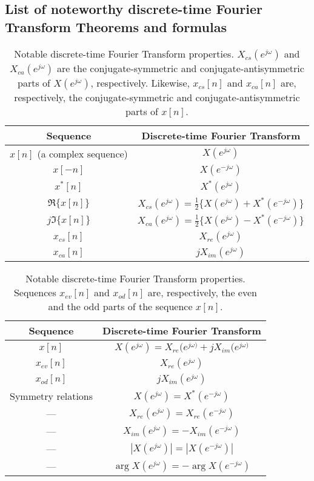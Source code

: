 \documentclass[\documentfontsize, twocolumn]{\classname}
\begin{document}
\subsection{List of noteworthy discrete-time Fourier Transform Theorems and formulas}

\begin{table*}[ht]
\centering
\begin{tabular}{c c}
    \hline
    \textbf{Sequence} & \textbf{Discrete-time Fourier Transform} \\
    \hline
    $x[n]$ (a complex sequence) & $X(e^{j\omega})$ \\
    \hline
    $x[-n]$ & $X(e^{-j\omega})$ \\
    $x^*[n]$ & $X^*(e^{j\omega})$ \\
    $\Re{\{x[n]\}}$ & $X_{cs}(e^{j\omega}) = \frac 1 2 \{X(e^{j\omega}) + X^*(e^{-j\omega})\}$\\
    $j\Im{\{x[n]\}}$ & $X_{ca}(e^{j\omega}) = \frac 1 2 \{X(e^{j\omega}) - X^*(e^{-j\omega})\}$\\
    $x_{cs}[n]$ & $X_{re}(e^{j\omega})$ \\
    $x_{ca}[n]$ & $jX_{im}(e^{j\omega})$ \\
    \hline
\end{tabular}
\caption{Notable discrete-time Fourier Transform properties. $X_{cs}(e^{j\omega})$ and $X_{ca}(e^{j\omega})$ are the conjugate-symmetric and conjugate-antisymmetric parts of $X(e^{j\omega})$, respectively. Likewise, $x_{cs}[n]$ and $x_{ca}[n]$ are, respectively, the conjugate-symmetric and conjugate-antisymmetric parts of $x[n]$.}\label{tab:discreteTimeFourierTransformPropertiesAndTheorems}
\end{table*}

\begin{table*}[ht]
\centering
\begin{tabular}{c c}
    \hline
    \textbf{Sequence} & \textbf{Discrete-time Fourier Transform} \\
    \hline
    $x[n]$ & $X(e^{j\omega}) = X_{re}(e^{j\omega)} + jX_{im}(e^{j\omega)}$ \\
    \hline
    $x_{ev}[n]$ & $X_{re}(e^{j\omega})$ \\
    $x_{od}[n]$ & $jX_{im}(e^{j\omega})$ \\
    \hline
    Symmetry relations & $X(e^{j\omega}) = X^*(e^{-j\omega})$ \\
    --- & $X_{re}(e^{j\omega}) = X_{re}(e^{-j\omega})$ \\
    --- & $X_{im}(e^{j\omega}) = -X_{im}(e^{-j\omega})$ \\
    --- & $|X(e^{j\omega})| = |X(e^{-j\omega})|$ \\
    --- & $\arg{X(e^{j\omega})} = -\arg{X(e^{-j\omega})}$ \\
    \hline
\end{tabular}
\caption{Notable discrete-time Fourier Transform properties. Sequences $x_{ev}[n]$ and $x_{od}[n]$ are, respectively, the even and the odd parts of the sequence $x[n]$.}\label{tab:discreteTimeFourierTransformPropertiesAndTheorems2}
\end{table*}
\end{document}
